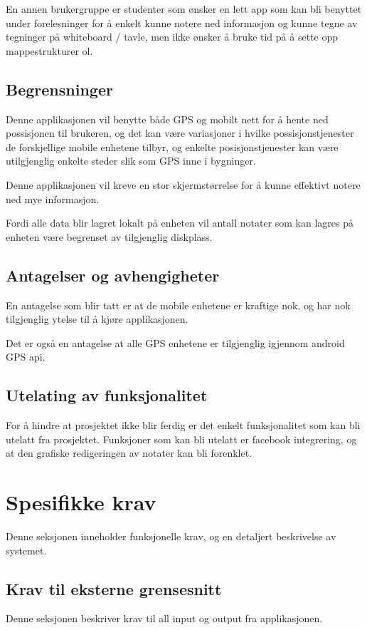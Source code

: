 \documentclass[a4paper, 12pt]{article}
\begin{document}
En annen brukergruppe er studenter som ønsker en lett app som kan bli benyttet under forelesninger for å enkelt kunne notere ned informasjon og kunne tegne av tegninger på whiteboard / tavle, men ikke ønsker å bruke tid på å sette opp mappestrukturer ol.

\subsection{Begrensninger}
Denne applikasjonen vil benytte både GPS og mobilt nett for å hente ned possisjonen til brukeren, og det kan være variasjoner i hvilke possisjonstjenester de forskjellige mobile enhetene tilbyr, og enkelte posisjonstjenester kan være utilgjenglig enkelte steder slik som GPS inne i bygninger.

Denne applikasjonen vil kreve en stor skjermstørrelse for å kunne effektivt notere ned mye informasjon.

Fordi alle data blir lagret lokalt på enheten vil antall notater som kan lagres på enheten være begrenset av tilgjenglig diskplass.

\subsection{Antagelser og avhengigheter}
En antagelse som blir tatt er at de mobile enhetene er kraftige nok, og har nok tilgjenglig ytelse til å kjøre applikasjonen.

Det er også en antagelse at alle GPS enhetene er tilgjenglig igjennom android GPS api.

\subsection{Utelating av funksjonalitet}
For å hindre at prosjektet ikke blir ferdig er det enkelt funksjonalitet som kan bli utelatt fra prosjektet. Funksjoner som kan bli utelatt er facebook integrering, og at den grafiske redigeringen av notater kan bli forenklet.

\section{Spesifikke krav}
Denne seksjonen inneholder funksjonelle krav, og en detaljert beskrivelse av systemet.

\subsection{Krav til eksterne grensesnitt}
Denne seksjonen beskriver krav til all input og output fra applikasjonen.
\end{document}
